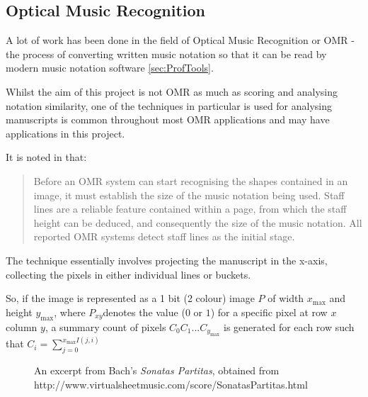 \subsection{Optical Music Recognition}

A lot of work has been done in the field of Optical Music Recognition or OMR - the process of converting written music notation so that it can be read by modern music notation software \ref{sec:ProfTools}.

Whilst the aim of this project is not OMR as much as scoring and analysing notation similarity, one of the techniques in particular is used for analysing manuscripts is common throughout most OMR applications and may have applications in this project.

It is noted in \cite{MSR13p65} that:

\begin{quotation}
Before an OMR system can start recognising the shapes contained in an image, it must establish the size of the music notation being used. Staff lines are a reliable feature contained within a page, from which the staff height can be deduced, and consequently the size of the music notation. All reported OMR systems detect staff lines as the initial stage.
\end{quotation}

The technique essentially involves projecting the manuscript in the x-axis, collecting the pixels in either individual lines or buckets.

So, if the image is represented as a 1 bit (2 colour) image $P$ of width $x_{\text{max}}$ and height $y_{\text{max}}$, where $P_{xy}$denotes the value ($0$ or $1$) for a specific pixel at row $x$ column $y$, a summary count of pixels $C_0 C_1 ... C_{y_{\text{max}}}$ is generated for each row such that $C_i = \sum_{j = 0}^{x_\text{max} I(j, i)}$

\begin{figure}[h!]
  \centering
  \caption{An excerpt from Bach's \emph{Sonatas Partitas}, obtained from http://www.virtualsheetmusic.com/score/SonatasPartitas.html}
  \label{fig:SonatasPartitas}
\end{figure}

